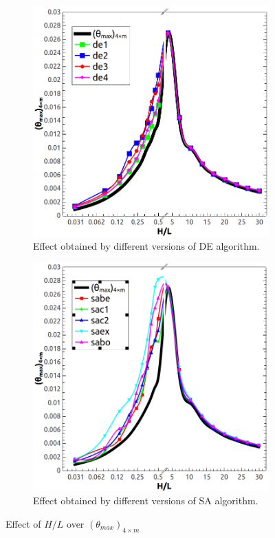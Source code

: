 \documentclass[10pt,fleqn,a4paper,twoside]{article}
\begin{document}
\begin{figure}[h!]
\centering
	\begin{subfigure}{0.52\textwidth}
		\centering
		\includegraphics[width=1\linewidth]{imgs/5dof/de/g_hl_tmin_1.png}
		\caption{ {\small Effect obtained by different versions of DE algorithm.}}
		\label{figure04:sub1}
	\end{subfigure}%
	\begin{subfigure}{0.52\textwidth}
		\centering
		\includegraphics[width=1\linewidth]{imgs/5dof/sa/g_hl_tmin_1.png}
		\caption{ {\small Effect obtained by different versions of SA algorithm.}}
		\label{figure04:sub2}
	\end{subfigure}%
\caption{Effect of $H/L$ over $({\theta}_{max})_{4\times m}$}
\label{figure04}
\end{figure}
\end{document}
